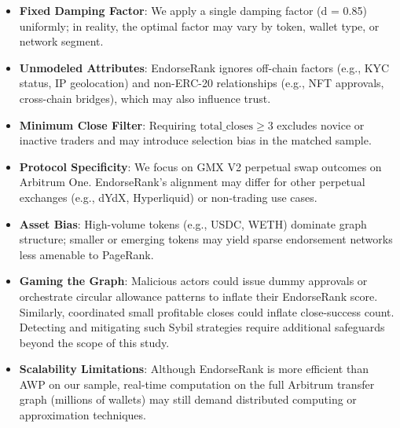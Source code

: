 \begin{itemize}
\item[\textbullet] \textbf{Fixed Damping Factor}: We apply a single damping factor (d = 0.85) uniformly; in reality, the optimal factor may vary by token, wallet type, or network segment.
\item[\textbullet] \textbf{Unmodeled Attributes}: EndorseRank ignores off-chain factors (e.g., KYC status, IP geolocation) and non-ERC-20 relationships (e.g., NFT approvals, cross-chain bridges), which may also influence trust.
\item[\textbullet] \textbf{Minimum Close Filter}: Requiring $\text{total\_closes} \geq 3$ excludes novice or inactive traders and may introduce selection bias in the matched sample.
\end{itemize}

\begin{itemize}
\item[\textbullet] \textbf{Protocol Specificity}: We focus on GMX V2 perpetual swap outcomes on Arbitrum One. EndorseRank's alignment may differ for other perpetual exchanges (e.g., dYdX, Hyperliquid) or non-trading use cases.
\item[\textbullet] \textbf{Asset Bias}: High-volume tokens (e.g., USDC, WETH) dominate graph structure; smaller or emerging tokens may yield sparse endorsement networks less amenable to PageRank.
\end{itemize}

\begin{itemize}
\item[\textbullet] \textbf{Gaming the Graph}: Malicious actors could issue dummy approvals or orchestrate circular allowance patterns to inflate their EndorseRank score. Similarly, coordinated small profitable closes could inflate close-success count. Detecting and mitigating such Sybil strategies require additional safeguards beyond the scope of this study.
\end{itemize}

\begin{itemize}
\item[\textbullet] \textbf{Scalability Limitations}: Although EndorseRank is more efficient than AWP on our sample, real-time computation on the full Arbitrum transfer graph (millions of wallets) may still demand distributed computing or approximation techniques.
\end{itemize}
